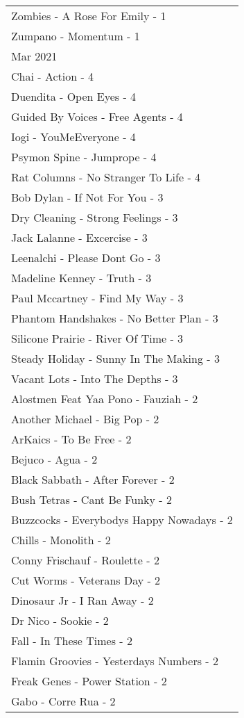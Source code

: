 \documentclass[
]{article}
\begin{document}
\begin{longtable}{l}
Zombies - A Rose For Emily - 1 \\ 
Zumpano - Momentum - 1 \\ 
\midrule
\multicolumn{1}{l}{Mar 2021} \\ 
\midrule
Chai - Action - 4 \\ 
Duendita - Open Eyes - 4 \\ 
Guided By Voices - Free Agents - 4 \\ 
Iogi - YouMeEveryone - 4 \\ 
Psymon Spine - Jumprope - 4 \\ 
Rat Columns - No Stranger To Life - 4 \\ 
Bob Dylan - If Not For You - 3 \\ 
Dry Cleaning - Strong Feelings - 3 \\ 
Jack Lalanne - Excercise - 3 \\ 
Leenalchi - Please Dont Go - 3 \\ 
Madeline Kenney - Truth - 3 \\ 
Paul Mccartney - Find My Way - 3 \\ 
Phantom Handshakes - No Better Plan - 3 \\ 
Silicone Prairie - River Of Time - 3 \\ 
Steady Holiday - Sunny In The Making - 3 \\ 
Vacant Lots - Into The Depths - 3 \\ 
Alostmen Feat Yaa Pono - Fauziah - 2 \\ 
Another Michael - Big Pop - 2 \\ 
ArKaics - To Be Free - 2 \\ 
Bejuco - Agua - 2 \\ 
Black Sabbath - After Forever - 2 \\ 
Bush Tetras - Cant Be Funky - 2 \\ 
Buzzcocks - Everybodys Happy Nowadays - 2 \\ 
Chills - Monolith - 2 \\ 
Conny Frischauf - Roulette - 2 \\ 
Cut Worms - Veterans Day - 2 \\ 
Dinosaur Jr - I Ran Away - 2 \\ 
Dr Nico - Sookie - 2 \\ 
Fall - In These Times - 2 \\ 
Flamin Groovies - Yesterdays Numbers - 2 \\ 
Freak Genes - Power Station - 2 \\ 
Gabo - Corre Rua - 2 \\ 

\end{longtable}
\end{document}
